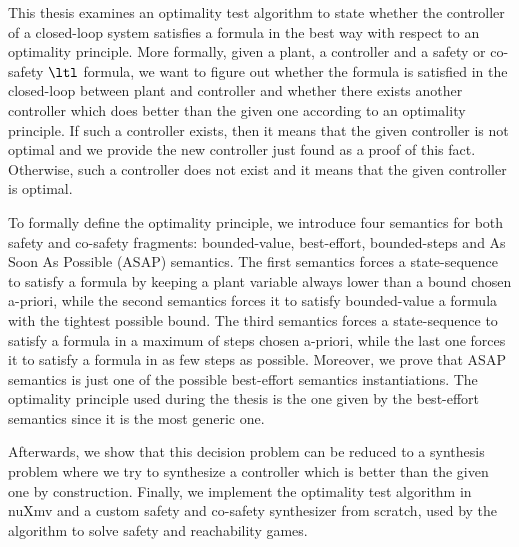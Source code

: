 

This thesis examines an optimality test algorithm to state whether the controller of a closed-loop system satisfies a formula in the best way with respect to an optimality principle.
More formally, given a plant, a controller and a safety or co-safety $\ltl$ formula, we want to figure out whether the formula is satisfied in the closed-loop between plant and controller and whether there exists another controller which does better than the given one according to an optimality principle.
If such a controller exists, then it means that the given controller is not optimal and we provide the new controller just found as a proof of this fact. Otherwise, such a controller does not exist and it means that the given controller is optimal.

To formally define the optimality principle, we introduce four semantics for both safety and co-safety fragments: bounded-value, best-effort, bounded-steps and As Soon As Possible (ASAP) semantics. 
The first semantics forces a state-sequence to satisfy a formula by keeping a plant variable always lower than a bound chosen a-priori, while the second semantics forces it to satisfy bounded-value a formula with the tightest possible bound.
The third semantics forces a state-sequence to satisfy a formula in a maximum of steps chosen a-priori, while the last one forces it to satisfy a formula in as few steps as possible.
Moreover, we prove that ASAP semantics is just one of the possible best-effort semantics instantiations.
The optimality principle used during the thesis is the one given by the best-effort semantics since it is the most generic one.

Afterwards, we show that this decision problem can be reduced to a synthesis problem where we try to synthesize a controller which is better than the given one by construction.
Finally, we implement the optimality test algorithm in nuXmv and a custom safety and co-safety synthesizer from scratch, used by the algorithm to solve safety and reachability games.
